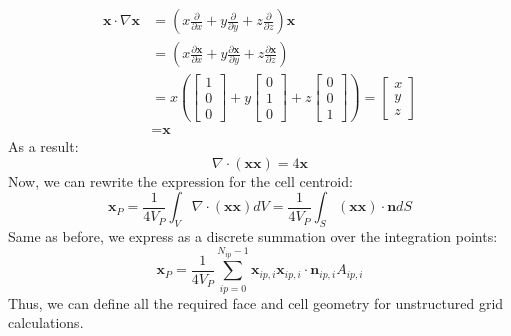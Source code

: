 \documentclass[11pt]{article}
\begin{document}
\begin{equation*}
\begin{aligned}
\textbf{x}\cdot\nabla \textbf{x} &= \left(x \frac{\partial}{\partial x} +
y \frac{\partial}{\partial y} + z \frac{\partial}{\partial z}   \right) \textbf{x} \\
& = \left(x \frac{\partial \textbf{x}}{\partial x} +
y \frac{\partial \textbf{x}}{\partial y} + z \frac{\partial \textbf{x}}{\partial z}   \right) \\
&= x\left( \begin{bmatrix} 1\\ 0\\ 0  \end{bmatrix}
+ y \begin{bmatrix} 0\\ 1\\ 0  \end{bmatrix}
+ z \begin{bmatrix} 0\\ 0\\ 1  \end{bmatrix}
\right) = \begin{bmatrix} x\\ y\\ z\end{bmatrix} \\
&= \textbf{x}
\end{aligned}
\end{equation*}
As a result:
\begin{equation*}
\nabla \cdot (\textbf{x}\textbf{x}) = 4\textbf{x}
\end{equation*}
Now, we can rewrite the expression for the cell centroid:
\begin{equation*}
\textbf{x}_P = \frac{1}{4V_P}\int_{V}\nabla \cdot (\textbf{x}\textbf{x})dV
= \frac{1}{4V_P}\int_{S}(\textbf{x}\textbf{x})\cdot \textbf{n}dS
\end{equation*}
Same as before, we express as a discrete summation over the integration points:
\begin{equation*}
\textbf{x}_P = \frac{1}{4V_P}\sum_{ip=0}^{N_{ip}-1}\textbf{x}_{ip,i}\textbf{x}_{ip,i}\cdot
\textbf{n}_{ip,i}A_{ip,i}
\end{equation*}
Thus, we can define all the required face and cell geometry for unstructured grid calculations.
\end{document}
